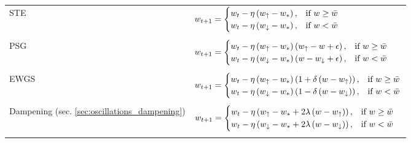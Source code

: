 \begin{center}
\begin{tabular}{ l | l } 
STE &  
$w_{t+1} = 
    \begin{cases}
    w_t - \eta  \left(w_{\uparrow} - w_* \right),   & \text{if }w \geq \bar{w}\\ 
    w_t - \eta  \left(w_{\downarrow} - w_* \right), & \text{if } w < \bar{w}\\
    \end{cases}$\\
    \\[-0.5em]
PSG  \citep{PBGS} & $ w_{t+1} = \begin{cases}
    w_t - \eta  \left(w_{\uparrow} - w_* \right)   \left(w_{\uparrow} -w + \epsilon\right),   & \text{if }w \geq \bar{w}\\
    w_t - \eta  \left(w_{\downarrow} - w_*\right) \left(w - w_{\downarrow}+ \epsilon\right),  & \text{if } w < \bar{w}\\
    \end{cases}$ \\
    \\[-0.5em]
  EWGS  \citep{EWGS} & $ w_{t+1} = \begin{cases}
    w_t - \eta  \left(w_{\uparrow} - w_* \right) \left(1+ \delta \left( w -w_{\uparrow}\right)\right), & \text{if }w \geq \bar{w}\\
    w_t - \eta  \left(w_{\downarrow} - w_*\right) \left(1- \delta \left(w - w_{\downarrow}\right)\right), & \text{if } w < \bar{w}\\
    \end{cases}$ \\
    \\[-0.5em]
  Dampening (sec. \ref{sec:oscillations_dampening}) & $ w_{t+1} = \begin{cases}
    w_t - \eta  \left(w_{\uparrow} - w_* + 2\lambda \left(w - w_{\uparrow}\right)\right), & \text{if }w \geq \bar{w}\\
    w_t - \eta  \left(w_{\downarrow} - w_* + 2\lambda \left(w - w_{\downarrow}\right)\right), & \text{if } w < \bar{w} \\
     \end{cases}$\\
       \\[-0.5em]
\end{tabular}
\end{center}

